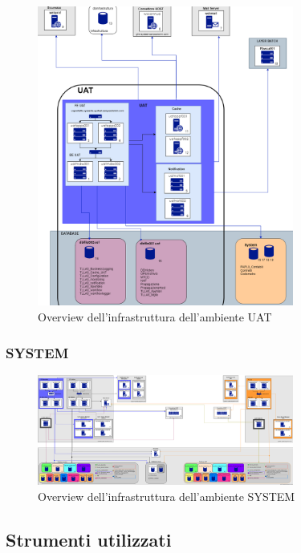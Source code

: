 \begin{figure}[h!]
    \centering
	\includegraphics[width=0.75\textwidth]{./res/img/Collegamenti_UAT.png}
    \caption{Overview dell'infrastruttura dell'ambiente UAT}
\end{figure}

\subsubsection{SYSTEM}

\begin{figure}[h!]
    \centering
	\includegraphics[width=0.75\textwidth]{./res/img/SchemiAmbienti_SYSTEM-UAT_v1.1.png}
    \caption{Overview dell'infrastruttura dell'ambiente SYSTEM}
\end{figure}

\subsection{Strumenti utilizzati}


